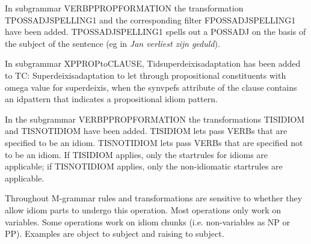 In subgrammar VERBPPROPFORMATION the transformation TPOSSADJSPELLING1 and the
corresponding filter FPOSSADJSPELLING1 have been added. TPOSSADJSPELLING1
spells out a POSSADJ on the basis of the subject of the sentence (eg in {\em 
Jan verliest zijn geduld}). 

In subgrammar XPPROPtoCLAUSE, Tidsuperdeixisadaptation has been added to TC:
Superdeixisadaptation to let through propositional constituents with omega
value for superdeixis, when the synvpefs attribute of the clause contains an
idpattern that indicates a propositional idiom pattern. 

In the subgrammar VERBPPROPFORMATION the transformations TISIDIOM and
TISNOTIDIOM have been added. TISIDIOM lets pass VERBs that are specified to be
an idiom. TISNOTIDIOM lets pass VERBs that are specified not
to be an idiom. If TISIDIOM applies, only the startrules for 
idioms are applicable; if TISNOTIDIOM applies, only the non-idiomatic
startrules are applicable. 

Throughout M-grammar rules and transformations are sensitive to whether they 
allow idiom parts to undergo this operation. Most operations only work on 
variables. Some operations work on idiom chunks (i.e. non-variables as NP or
PP). Examples are object to subject and raising to subject.





